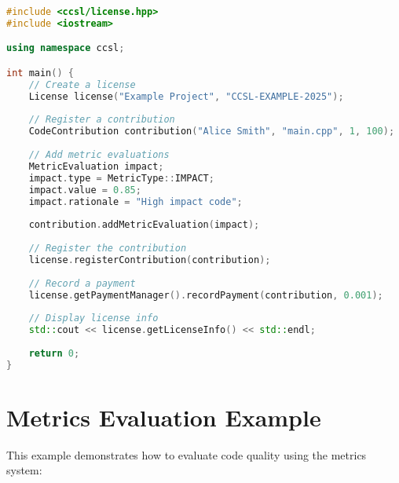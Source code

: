 \documentclass[11pt,a4paper]{report}
\begin{document}
\begin{lstlisting}[language=C++]
#include <ccsl/license.hpp>
#include <iostream>

using namespace ccsl;

int main() {
    // Create a license
    License license("Example Project", "CCSL-EXAMPLE-2025");
    
    // Register a contribution
    CodeContribution contribution("Alice Smith", "main.cpp", 1, 100);
    
    // Add metric evaluations
    MetricEvaluation impact;
    impact.type = MetricType::IMPACT;
    impact.value = 0.85;
    impact.rationale = "High impact code";
    
    contribution.addMetricEvaluation(impact);
    
    // Register the contribution
    license.registerContribution(contribution);
    
    // Record a payment
    license.getPaymentManager().recordPayment(contribution, 0.001);
    
    // Display license info
    std::cout << license.getLicenseInfo() << std::endl;
    
    return 0;
}
\end{lstlisting}

\section{Metrics Evaluation Example}

This example demonstrates how to evaluate code quality using the metrics system:
\end{document}
